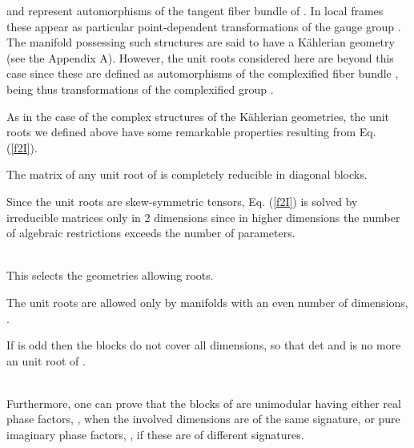 \documentclass[a4paper,12pt]{article}
\begin{document}
and represent automorphisms of the tangent fiber bundle \coordHE{} of 
\coordHE{}. In local frames these appear as particular point-dependent
transformations of the gauge group \coordHE{}. 
The manifold possessing such structures are said to have a K\" ahlerian 
geometry (see the Appendix A). However, the unit roots considered here 
are beyond this case since these are defined as automorphisms of the 
complexified fiber bundle \coordHE{}, being thus 
transformations of the complexified group 
\coordHE{}.   

As in the case of the complex structures of the K\" ahlerian geometries, the 
unit roots we defined above have some remarkable properties resulting from 
Eq. (\ref{f2I}).
\begin{lem}
The matrix of any unit root \coordHE{} of \coordHE{} is completely 
reducible in \coordHE{} diagonal blocks.  
\end{lem}
\begin{demo}
Since the unit roots are  skew-symmetric tensors,  Eq. (\ref{f2I}) 
is solved by irreducible matrices only in 2 dimensions since in higher 
dimensions the number of algebraic restrictions exceeds the number of 
parameters.
\end{demo}\\
This selects the geometries allowing roots.
\begin{cor}
The unit roots are allowed only by manifolds \coordHE{} with an even number of 
dimensions, \coordHE{}. 
\end{cor}
\begin{demo}
If \coordHE{} is odd then the \coordHE{} blocks do not cover all dimensions, so 
that det\coordHE{} and \coordHE{} is no more an unit root of \coordHE{}.
\end{demo}\\
Furthermore, one can prove that the \coordHE{} blocks of 
\coordHE{} are unimodular having either real phase factors, \coordHE{}, 
when the involved dimensions are of the same signature, or pure imaginary 
phase factors, \coordHE{}, if these are of different signatures. 
\end{document}
